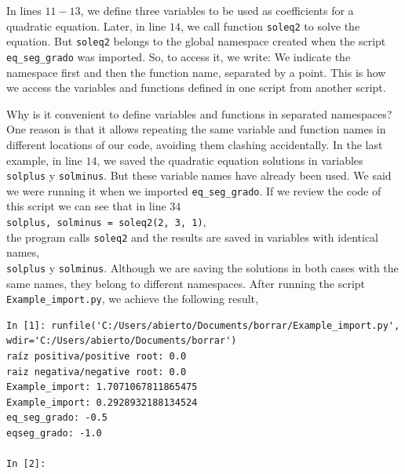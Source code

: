 \begin{paracol}{2}
In lines $11 - 13$, we define three variables to be used as coefficients for a quadratic equation. Later, in line $14$, we call function \texttt{soleq2} to solve the equation. But \texttt{soleq2} belongs to the global namespace created when the script \texttt{eq_seg_grado} was imported. So, to access it, we write:
We indicate the namespace first and then the function name, separated by a point. This is how we access the variables and functions defined in one script from another script. 

Why is it convenient to define variables and functions in separated namespaces? One reason is that it allows repeating the same variable and function names in different locations of our code, avoiding them clashing accidentally. In the last example, in line $14$, we saved the quadratic equation solutions in variables \texttt{solplus} y \texttt{solminus}. But these variable names have already been used. We said we were running it when we imported \texttt{eq_seg_grado}. If we review the code of this script we can see that in line $34$\\ \texttt{solplus, solminus = soleq2(2, 3, 1)},\\ the program calls \texttt{soleq2} and the results are saved in variables with identical names,\\ \texttt{solplus} y \texttt{solminus}. Although we are saving the solutions in both cases with the same names, they belong to different namespaces. After running the script \texttt{Example_import.py}, we achieve the following result,   

\end{paracol}
\begin{verbatim}
In [1]: runfile('C:/Users/abierto/Documents/borrar/Example_import.py',
wdir='C:/Users/abierto/Documents/borrar')
raíz positiva/positive root: 0.0
raiz negativa/negative root: 0.0
Example_import: 1.7071067811865475
Example_import: 0.2928932188134524
eq_seg_grado: -0.5
eqseg_grado: -1.0

In [2]: 
\end{verbatim}

